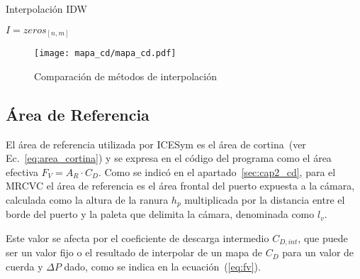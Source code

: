 \begin{algorithm}
    \caption{Interpolación IDW}\label{algo:IDW}


    \BlankLine
    $I=zeros_{[n,m]}$\;
\end{algorithm}


\begin{figure}
    \centering
    \texttt{[image: mapa\_cd/mapa\_cd.pdf]}
    \caption{Comparación de métodos de interpolación}\label{fig:mapas_interpolados}
\end{figure}


\subsection{Área de Referencia}
%
El área de referencia utilizada por ICESym es el área de
cortina~(ver Ec.~\ref{eq:area_cortina}) y se expresa en el código del programa como el
área efectiva $F_{V}=A_{R}\cdot C_{D}$.
%
Como se indicó en el apartado~\ref{sec:cap2_cd}, para el  MRCVC el área de
referencia es el área frontal del puerto expuesta a la cámara, calculada como la
altura de la ranura $h_{p}$ multiplicada por la distancia entre el borde del
puerto y la paleta que delimita la cámara, denominada como $l_{v}$.

%
%
Este valor se afecta por el coeficiente de descarga intermedio $C_{D,int}$, que
puede ser un valor fijo o el resultado de interpolar de un mapa de $C_D$ para un
valor de cuerda y $\Delta P$ dado, como se indica en la ecuación~(\ref{eq:fv}).


